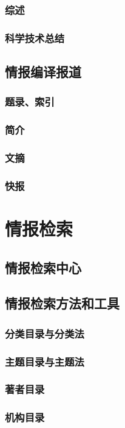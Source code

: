 \documentclass[UTF8]{../../ApplicationUniverse}
\begin{document}
        \subsubsection{综述}
        \subsubsection{科学技术总结}
    \subsection{情报编译报道}
        \subsubsection{题录、索引}
        \subsubsection{简介}
        \subsubsection{文摘}
        \subsubsection{快报}

\section{情报检索}
    \subsection{情报检索中心}
    \subsection{情报检索方法和工具}
        \subsubsection{分类目录与分类法}
        \subsubsection{主题目录与主题法}
        \subsubsection{著者目录}
        \subsubsection{机构目录}
\end{document}

